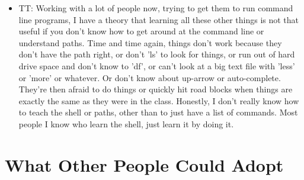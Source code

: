 \documentclass{article}
\begin{document}
\begin{itemize}
  \item TT: Working with a lot of people now, trying to get them to
    run command line programs, I have a theory that learning all these
    other things is not that useful if you don't know how to get
    around at the command line or understand paths. Time and time
    again, things don't work because they don't have the path right,
    or don't 'ls' to look for things, or run out of hard drive space
    and don't know to 'df', or can't look at a big text file with
    'less' or 'more' or whatever.  Or don't know about up-arrow or
    auto-complete.  They're then afraid to do things or quickly hit
    road blocks when things are exactly the same as they were in the
    class.  Honestly, I don't really know how to teach the shell or
    paths, other than to just have a list of commands.  Most people I
    know who learn the shell, just learn it by doing it.

\end{itemize}

\section{What Other People Could Adopt}
\end{document}
